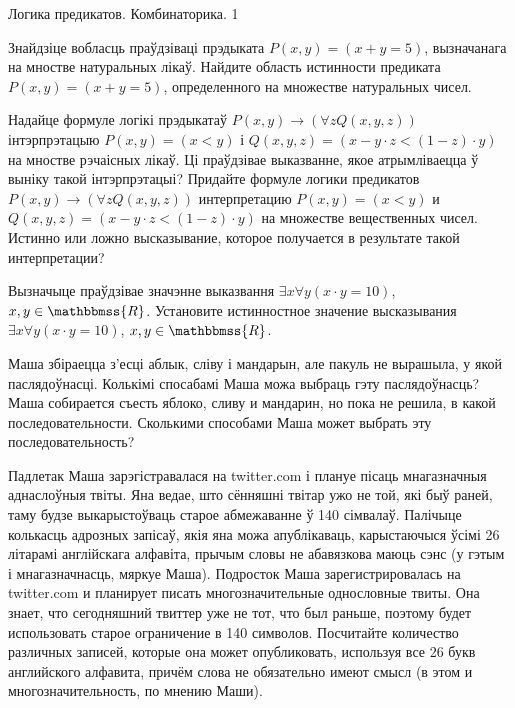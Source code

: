 \documentclass[11pt,twoside]{article}
\begin{document}
{Логика предикатов. Комбинаторика.}
{1}

\begin{problemList}

\problemItemSimple
{Знайдзіце вобласць праўдзіваці прэдыката $P(x, y) = (x + y = 5)$, вызначанага на мностве натуральных лікаў.}
{Найдите область истинности предиката $P(x, y) = (x + y = 5)$, определенного на множестве натуральных чисел.}

\bigskip

\problemItemSimple
{Надайце формуле логікі прэдыкатаў $P(x, y) \to (\forall{ z Q(x, y, z)})$ інтэрпрэтацыю $P(x, y) = (x < y)$ і $Q(x, y, z) = (x - y \cdot z < (1 - z) \cdot y)$ на мностве рэчаісных лікаў.
Ці праўдзівае выказванне, якое атрымліваецца ў выніку такой інтэрпрэтацыі?}
{Придайте формуле логики предикатов $P(x, y) \to (\forall{ z Q(x, y, z)})$ интерпретацию $P(x, y) = (x < y)$ и $Q(x, y, z) = (x - y \cdot z < (1 - z) \cdot y)$ на множестве вещественных чисел.
Истинно или ложно высказывание, которое получается в результате такой интерпретации?}

\bigskip

\problemItemSimple
{Вызначыце праўдзівае значэнне выказвання $\exists{x \forall{y {(x \cdot y = 10)}}}$, $x, y \in \mathbbmss{R}$.}
{Установите истинностное значение высказывания $\exists{x \forall{y {(x \cdot y = 10)}}}$, $x, y \in \mathbbmss{R}$.}

\bigskip

\problemItemSimple
{Маша збіраецца з'есці аблык, сліву і мандарын, але пакуль  не вырашыла, у якой паслядоўнасці.
Колькімі спосабамі Маша можа выбраць гэту паслядоўнасць?}
{Маша собирается съесть яблоко, сливу и мандарин, но пока не решила, в какой последовательности.
Сколькими способами Маша может выбрать эту последовательность?}

\bigskip

\problemItemSimple
{Падлетак Маша зарэгістравалася на twitter.com і плануе пісаць мнагазначныя аднаслоўныя твіты.
Яна ведае, што сённяшні твітар ужо не той, які быў раней, таму будзе выкарыстоўваць старое абмежаванне ў 140 сімвалаў.
Палічыце колькасць адрозных запісаў, якія яна можа апублікаваць, карыстаючыся ўсімі 26 літарамі англійскага алфавіта,
прычым словы не абавязкова маюць сэнс (у гэтым і мнагазначнасць, мяркуе Маша).}
{Подросток Маша зарегистрировалась на twitter.com и планирует писать многозначительные однословные твиты.
Она знает, что сегодняшний твиттер уже не тот, что был раньше, поэтому будет использовать старое ограничение в 140 символов.
Посчитайте количество различных записей, которые она может опубликовать, используя все 26 букв английского алфавита,
причём слова не обязательно имеют смысл (в этом и многозначительность, по мнению Маши).}


\end{problemList}
\end{document}
